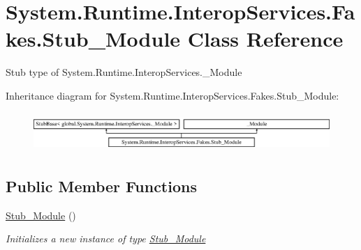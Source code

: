 \hypertarget{class_system_1_1_runtime_1_1_interop_services_1_1_fakes_1_1_stub___module}{\section{System.\-Runtime.\-Interop\-Services.\-Fakes.\-Stub\-\_\-\-Module Class Reference}
\label{class_system_1_1_runtime_1_1_interop_services_1_1_fakes_1_1_stub___module}
}


Stub type of System.\-Runtime.\-Interop\-Services.\-\_\-\-Module 


Inheritance diagram for System.\-Runtime.\-Interop\-Services.\-Fakes.\-Stub\-\_\-\-Module\-:\begin{figure}[H]
\begin{center}
\leavevmode
\includegraphics[height=1.517615cm]{class_system_1_1_runtime_1_1_interop_services_1_1_fakes_1_1_stub___module}
\end{center}
\end{figure}
\subsection*{Public Member Functions}
\begin{DoxyCompactItemize}
\item 
\hyperlink{class_system_1_1_runtime_1_1_interop_services_1_1_fakes_1_1_stub___module_a23bac254ca011708a77aa05b1e44b45e}{Stub\-\_\-\-Module} ()
\begin{DoxyCompactList}\small\item\em Initializes a new instance of type \hyperlink{class_system_1_1_runtime_1_1_interop_services_1_1_fakes_1_1_stub___module}{Stub\-\_\-\-Module}\end{DoxyCompactList}\end{DoxyCompactItemize}
